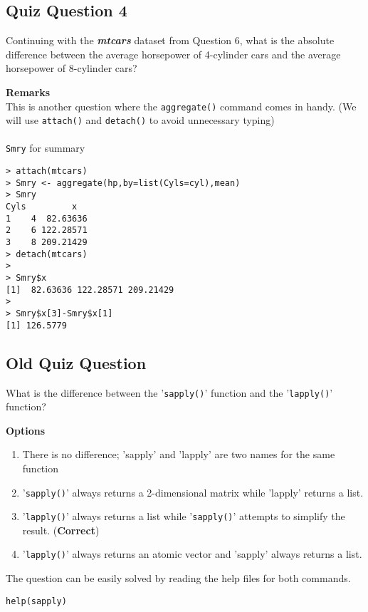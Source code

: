 \documentclass[12pt]{article}
\begin{document}
\subsection*{Quiz Question 4}
Continuing with the \textit{\textbf{mtcars}} dataset from Question 6, what is the absolute difference between the average horsepower of 4-cylinder cars and the average horsepower of 8-cylinder cars?

\bigskip
\noindent \textbf{Remarks}\\
This is another question where the \texttt{aggregate()} command comes in handy. (We will use \texttt{attach()} and \texttt{detach()} to avoid unnecessary typing)\\ \\ \texttt{Smry} for summary
\begin{verbatim}
> attach(mtcars)
> Smry <- aggregate(hp,by=list(Cyls=cyl),mean)
> Smry 
Cyls         x
1    4  82.63636
2    6 122.28571
3    8 209.21429
> detach(mtcars)
>
> Smry$x
[1]  82.63636 122.28571 209.21429
>
> Smry$x[3]-Smry$x[1]
[1] 126.5779
\end{verbatim}


\newpage
\subsection*{Old Quiz Question }
What is the difference between the '\texttt{sapply()}' function and the '\texttt{lapply()}' function?

\noindent \textbf{Options}
\begin{enumerate}
	\item There is no difference; 'sapply' and 'lapply' are two names for the same function
	\item '\texttt{sapply()}' always returns a 2-dimensional matrix while 'lapply' returns a list.
	\item '\texttt{lapply()}' always returns a list while '\texttt{sapply()}' attempts to simplify the result. (\textbf{Correct})
	\item '\texttt{lapply()}' always returns an atomic vector and 'sapply' always returns a list.
\end{enumerate}

\noindent The question can be easily solved by reading the help files for both commands.
\begin{verbatim}
help(sapply)
\end{verbatim}
\newpage
\end{document}
